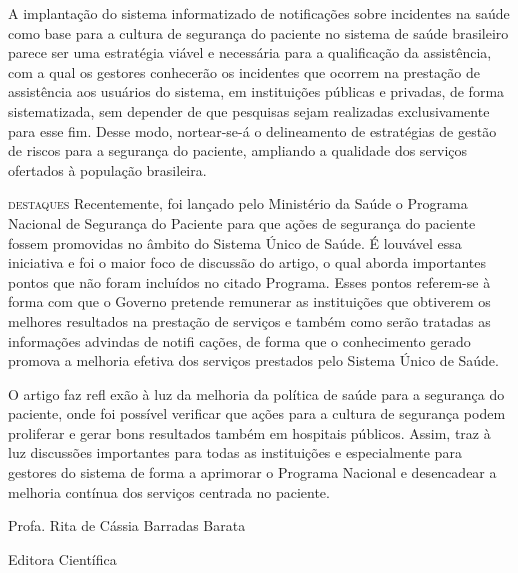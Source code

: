 \documentclass{article}
\begin{document}
A implantação do sistema informatizado de notificações sobre incidentes na saúde
como base
para a cultura de segurança do paciente no sistema de saúde brasileiro parece
ser uma
estratégia viável e necessária para a qualificação da assistência, com a qual os
gestores
conhecerão os incidentes que ocorrem na prestação de assistência aos usuários do
sistema, em
instituições públicas e privadas, de forma sistematizada, sem depender de que
pesquisas
sejam realizadas exclusivamente para esse fim. Desse modo, nortear-se-á o
delineamento de
estratégias de gestão de riscos para a segurança do paciente, ampliando a
qualidade dos
serviços ofertados à população brasileira.

\textsc{destaques}
Recentemente, foi lançado pelo Ministério da Saúde o Programa Nacional de
Segurança do
Paciente para que ações de segurança do paciente fossem promovidas no âmbito do
Sistema
Único de Saúde. É louvável essa iniciativa e foi o maior foco de discussão do
artigo, o qual
aborda importantes pontos que não foram incluídos no citado Programa. Esses
pontos
referem-se à forma com que o Governo pretende remunerar as instituições que
obtiverem os
melhores resultados na prestação de serviços e também como serão tratadas as
informações
advindas de notifi cações, de forma que o conhecimento gerado promova a melhoria
efetiva dos
serviços prestados pelo Sistema Único de Saúde.

O artigo faz refl exão à luz da melhoria da política de saúde para a segurança
do paciente,
onde foi possível verificar que ações para a cultura de segurança podem
proliferar e gerar
bons resultados também em hospitais públicos. Assim, traz à luz discussões
importantes para
todas as instituições e especialmente para gestores do sistema de forma a
aprimorar o
Programa Nacional e desencadear a melhoria contínua dos serviços centrada no
paciente.

Profa. Rita de Cássia Barradas Barata

Editora Científica
\end{document}
